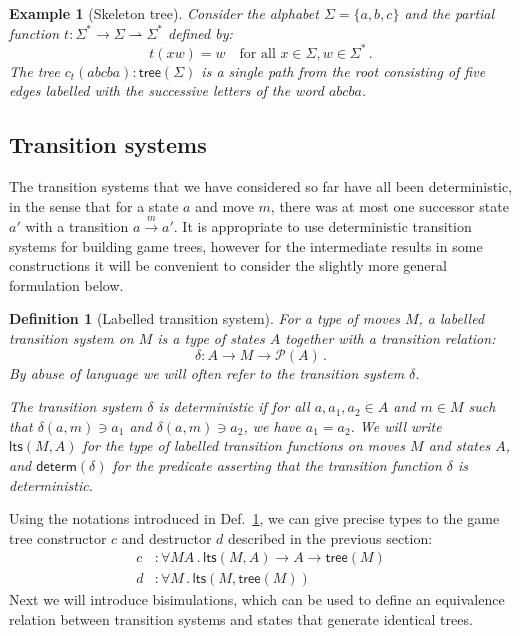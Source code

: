 \documentclass[11pt]{article}
\newcommand{\kw}[1]{{\mathsf{#1}}}
\newtheorem{definition}{Definition}
\newtheorem{example}{Example}
\begin{document}
\begin{example}[Skeleton tree]
Consider the alphabet $\Sigma = \{ a, b, c \}$
and the partial function
$t : \Sigma^* \rightarrow \Sigma \rightharpoonup \Sigma^*$ defined by:
\[
    t(x w) = w \quad \mbox{for all } x \in \Sigma, w \in \Sigma^* \,.
\]
The tree $c_t(abcba) : \kw{tree}(\Sigma)$ is a single path from the root
consisting of five edges labelled with the successive letters
of the word $abcba$.
\end{example}

\subsection{Transition systems}

The transition systems that we have considered so far
have all been deterministic,
in the sense that for a state $a$ and move $m$,
there was at most one successor state $a'$
with a transition $a \stackrel{m}{\rightarrow} a'$.
It is appropriate to use deterministic transition systems
for building game trees,
however for the intermediate results in some constructions
it will be convenient to consider
the slightly more general formulation below.

\begin{definition}[Labelled transition system] \label{def:lts}
For a type of moves $M$,
a \emph{labelled transition system} on $M$
is a type of states $A$
together with a transition relation:
\[ \delta : A \rightarrow M \rightarrow \mathcal{P}(A) \,. \]
By abuse of language we will often refer to
\emph{the transition system $\delta$}.

The transition system $\delta$ is \emph{deterministic}
if for all $a, a_1, a_2 \in A$ and $m \in M$
such that $\delta(a, m) \ni a_1$ and $\delta(a, m) \ni a_2$,
we have $a_1 = a_2$.
We will write $\kw{lts}(M, A)$ for the type of
labelled transition functions on moves $M$ and states $A$,
and $\kw{determ}(\delta)$ for the predicate asserting that
the transition function $\delta$ is deterministic.
\end{definition}

Using the notations introduced in Def.~\ref{def:lts},
we can give precise types to the game tree constructor $c$
and destructor $d$ described in the previous section:
\begin{align*}
  c &: \forall M A \, . \, \kw{lts}(M, A) \rightarrow A \rightarrow \kw{tree}(M) \\
  d &: \forall M \, . \, \kw{lts}(M, \kw{tree}(M))
\end{align*}
Next we will introduce bisimulations,
which can be used to define an equivalence relation
between transition systems and states
that generate identical trees.
\end{document}
